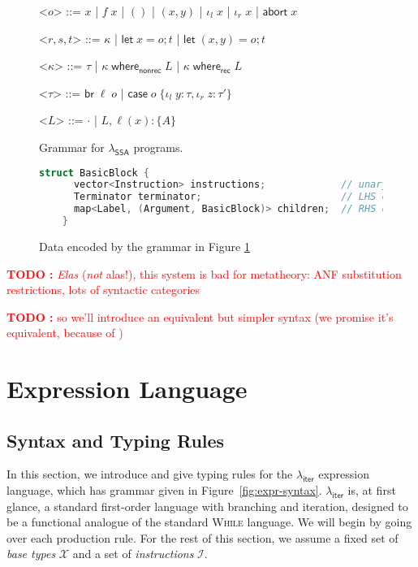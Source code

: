 \documentclass[acmsmall,screen,review]{acmart}
\newcounter{todos}
\newcommand{\TODO}[1]{{
  \stepcounter{todos}
  \begin{center}\large{\textcolor{red}{\textbf{TODO \arabic{todos}:} #1}}\end{center}
}}
\newcommand{\mc}[1]{\ensuremath{\mathcal{#1}}}
\newcommand{\ms}[1]{\ensuremath{\mathsf{#1}}}
\newcommand{\lto}{:}
\newcommand{\linl}[1]{\iota_l\;{#1}}
\newcommand{\linr}[1]{\iota_r\;{#1}}
\newcommand{\labort}[1]{\ms{abort}\;{#1}}
\newcommand{\letstmt}[3]{\ensuremath{\ms{let}\;#1 = #2; #3}}
\newcommand{\brb}[2]{\ms{br}\;#1\;#2}
\newcommand{\casestmt}[5]{\ms{case}\;#1\;\{\linl{#2} \lto #3, \linr{#4} \lto #5\}}
\newcommand{\awhere}[2]{#1\;\ms{where}_{\ms{nonrec}}\;#2}
\newcommand{\cwhere}[2]{#1\;\ms{where}_{\ms{rec}}\;#2}
\newcommand{\wbranch}[3]{#1(#2) \lto \{#3\}}
\newcommand{\subiterexp}{\texorpdfstring{\(\lambda_{\ms{iter}}\)}{lambda-iter}}
\newcommand{\isotopessa}{\(\lambda_{\ms{SSA}}\)}
\begin{document}
\begin{figure}
  \begin{grammar}
    <\(o\)> ::= \(x\)
      \;|\; \(f\;x\)
      \;|\; \(()\)
      \;|\; \((x, y)\)
      \;|\;  \(\linl{x}\)
      \;|\; \(\linr{x}\)
      \;|\; \(\labort{x}\)

    <\(r, s, t\)> ::= \(\kappa\)
      \;|\; \(\letstmt{x}{o}{t}\)
      \;|\; \(\letstmt{(x, y)}{o}{t}\)

    <\(\kappa\)> ::= \(\tau\) \;|\; \(\awhere{\kappa}{L}\) \;|\; \(\cwhere{\kappa}{L}\)

    <\(\tau\)> ::= \(\brb{\ell}{o}\)
      \;|\; \(\casestmt{o}{y}{\tau}{z}{\tau'}\)

    <\(L\)> ::= \(\cdot\) \;|\; \(L, \wbranch{\ell}{x}{A}\)
  \end{grammar}
  \caption{Grammar for \isotopessa{} programs.}
  \Description{}
  \label{fig:ssa-syntax}
\end{figure}

\begin{figure}
  \begin{lstlisting}[language=C++]
    struct BasicBlock {
      vector<Instruction> instructions;             // unary/binary let-bindings
      Terminator terminator;                        // LHS of where-block
      map<Label, (Argument, BasicBlock)> children;  // RHS of where-block
    }
  \end{lstlisting}
  \caption{Data encoded by the grammar in Figure \ref{fig:ssa-syntax}}
  \Description{}
  \label{fig:ssa-data}
\end{figure}

\TODO{\emph{Elas} (\emph{not} alas!), this system is bad for metatheory: ANF substitution restrictions, lots of
syntactic categories}

\TODO{so we'll introduce an equivalent but simpler syntax (we promise it's equivalent, because of
\citet{bohm-jacopini})}

\section{Expression Language}

\subsection{Syntax and Typing Rules}

In this section, we introduce and give typing rules for the \subiterexp{} expression language, which
has grammar given in Figure~\ref{fig:expr-syntax}. \subiterexp{} is, at first glance, a
standard first-order language with branching and iteration, designed to be a functional analogue of
the standard \textsc{While} language. We will begin by going over each production rule. For the rest
of this section, we assume a fixed set of \emph{base types} $\mc{X}$ and a set of
\emph{instructions} $\mc{I}$. 
\end{document}

